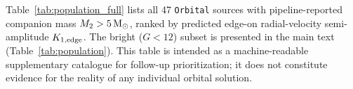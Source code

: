 \documentclass[usenatbib,fleqn]{mnras}
\newcommand{\Msun}{{\rm M}_\odot}
\begin{document}
Table~\ref{tab:population_full} lists all 47 \texttt{Orbital}
sources with pipeline-reported companion mass
$M_2 > 5\,\Msun$, ranked by predicted edge-on radial-velocity
semi-amplitude $K_{1,\rm edge}$.  The bright ($G < 12$) subset is
presented in the main text (Table~\ref{tab:population}).
This table is intended as a machine-readable supplementary
catalogue for follow-up prioritization; it does not constitute
evidence for the reality of any individual orbital solution.




\label{lastpage}
\end{document}
